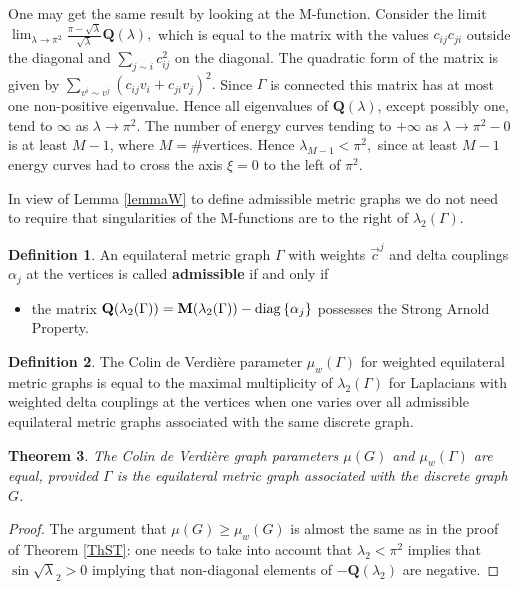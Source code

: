 \documentclass{amsart}
\newtheorem{theorem}{Theorem}[section]
\theoremstyle{definition}
\newtheorem{definition}[theorem]{Definition}
\theoremstyle{remark}
\numberwithin{equation}{section}
\begin{document}
{One may get the same result by looking at the M-function.
Consider the limit 
$ \lim_{\lambda \rightarrow\pi^2}\frac{\pi-\sqrt{\lambda }}{\sqrt{\lambda }}\mathbf{Q}(\lambda ), $
which is equal to the matrix with the values $c_{ij}c_{ji}$ outside the diagonal and $\sum_{j\sim i} c_{ij}^2$ on the diagonal. 
The quadratic form of the matrix is given by
$ \sum_{v^i\sim v^j} \left( c_{ij} v_i + c_{ji} v_j \right)^2. $
Since $\Gamma$ is connected this matrix has at most one non-positive eigenvalue. 
Hence all eigenvalues  of $\mathbf{Q}(\lambda )$, except possibly one,
 tend to $\infty$ as $\lambda \rightarrow\pi^2$. 
 The number of energy curves tending to $ + \infty $ as $ \lambda \rightarrow \pi^2-0 $ is at least $ M-1$, where $ M = \# \mbox{vertices}. $
 Hence $ \lambda_{M-1} < \pi^2,$
since at least $ M-1$ energy curves had to cross the axis $ \xi = 0 $ to the left of $ \pi^2$. 

In view of Lemma \ref{lemmaW} to define admissible metric graphs we do not need to require that singularities of
the M-functions are to the right of $ \lambda_2 (\Gamma)$.

\begin{definition}
An equilateral metric graph $ \Gamma $ with weights $\vec{c}^j$ and delta couplings $ \alpha_j $ at the vertices is called
{\bf admissible} if and only if
\begin{itemize}
\item the matrix $ \mathbf Q(\lambda_2(\Gamma)) = \mathbf M (\lambda_2(\Gamma)) - {\rm diag}\, \{ \alpha_j \} $
possesses the Strong Arnold Property.
\end{itemize}
\end{definition}

\begin{definition}
The Colin de Verdi\` ere parameter $ \mu_w (\Gamma) $ for weighted equilateral metric graphs is equal to
the maximal multiplicity of $\lambda_2 (\Gamma) $ for Laplacians with weighted delta couplings at the vertices when one varies
over all admissible equilateral metric graphs associated with the same discrete graph.
\end{definition}
 
\begin{theorem} The Colin de Verdi{\`e}re graph parameters $\mu(G)$ and  $ \mu_w (\Gamma)$ are equal, provided $ \Gamma $ is the 
equilateral metric graph associated with the discrete graph $ G$.
\end{theorem}

\begin{proof}
The argument that $ \mu(G)\geq \mu_w (G) $ is almost the same as in the proof of Theorem \ref{ThST}: one needs to take into account that
 $\lambda_2<\pi^2 $ implies that $ \sin \sqrt{\lambda}_2  >0 $ implying that non-diagonal elements of $ -\mathbf Q(\lambda_2) $
 are negative.


\end{proof}}
\end{document}
